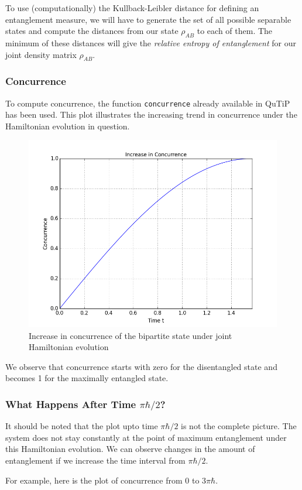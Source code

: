 To use (computationally) the Kullback-Leibler distance for defining an entanglement measure, we will have to generate the set of all possible separable states and compute the distances from our state $\rho_{AB}$ to each of them. The minimum of these distances will give the \textit{relative entropy of entanglement} for our joint density matrix $\rho_{AB}$.


\pagebreak
\subsubsection{Concurrence}
To compute concurrence, the function \texttt{concurrence} already available in QuTiP has been used. This plot illustrates the increasing trend in concurrence under the Hamiltonian evolution in question.

\begin{center}
\begin{figure}[H]
  \begin{center}
    \includegraphics[scale=0.62]{figures/timeevolution-07.png}
    \caption{Increase in concurrence of the bipartite state under joint Hamiltonian evolution}
    \label{fig: Time Evolution: Concurrence}
  \end{center}
\end{figure}
\end{center}

We observe that concurrence starts with zero for the disentangled state and becomes 1 for the maximally entangled state.

\pagebreak
\subsubsection{What Happens After Time $\pi\hbar/2$?}
It should be noted that the plot upto time $\pi\hbar/2$ is not the complete picture. The system does not stay constantly at the point of maximum entanglement under this Hamiltonian evolution. We can observe changes in the amount of entanglement if we increase the time interval from $\pi\hbar/2$.
\par For example, here is the plot of concurrence from 0 to $3\pi\hbar$.

